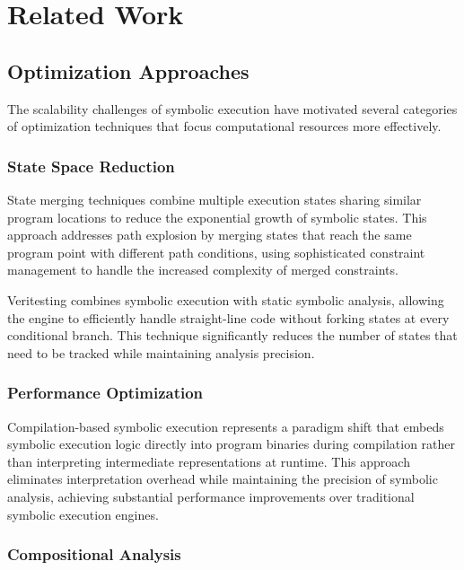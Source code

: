 \chapter{Related Work}

\section{Optimization Approaches}

The scalability challenges of symbolic execution have motivated several categories of optimization techniques that focus computational resources more effectively.

\subsection{State Space Reduction}

State merging techniques \cite{kuznetsov_efficient_2012} combine multiple execution states sharing similar program locations to reduce the exponential growth of symbolic states. This approach addresses path explosion by merging states that reach the same program point with different path conditions, using sophisticated constraint management to handle the increased complexity of merged constraints.

Veritesting \cite{avgerinos_enhancing_2014} combines symbolic execution with static symbolic analysis, allowing the engine to efficiently handle straight-line code without forking states at every conditional branch. This technique significantly reduces the number of states that need to be tracked while maintaining analysis precision.

\subsection{Performance Optimization}

Compilation-based symbolic execution \cite{poeplau_symbolic_2020} represents a paradigm shift that embeds symbolic execution logic directly into program binaries during compilation rather than interpreting intermediate representations at runtime. This approach eliminates interpretation overhead while maintaining the precision of symbolic analysis, achieving substantial performance improvements over traditional symbolic execution engines.

\subsection{Compositional Analysis}

